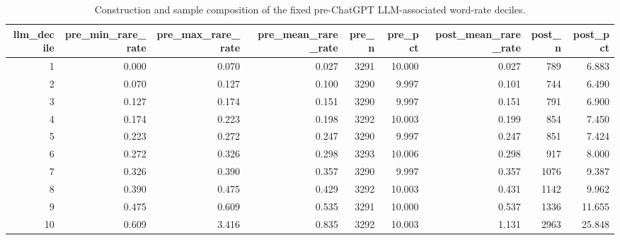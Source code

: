 \begin{table}
\caption{Construction and sample composition of the fixed pre-ChatGPT LLM-associated word-rate deciles.}
\label{tab:llm_decile_composition}
\begin{tabular}{rrrrrrrrr}
\toprule
llm_decile & pre_min_rare_rate & pre_max_rare_rate & pre_mean_rare_rate & pre_n & pre_pct & post_mean_rare_rate & post_n & post_pct \\
\midrule
1 & 0.000 & 0.070 & 0.027 & 3291 & 10.000 & 0.027 & 789 & 6.883 \\
2 & 0.070 & 0.127 & 0.100 & 3290 & 9.997 & 0.101 & 744 & 6.490 \\
3 & 0.127 & 0.174 & 0.151 & 3290 & 9.997 & 0.151 & 791 & 6.900 \\
4 & 0.174 & 0.223 & 0.198 & 3292 & 10.003 & 0.199 & 854 & 7.450 \\
5 & 0.223 & 0.272 & 0.247 & 3290 & 9.997 & 0.247 & 851 & 7.424 \\
6 & 0.272 & 0.326 & 0.298 & 3293 & 10.006 & 0.298 & 917 & 8.000 \\
7 & 0.326 & 0.390 & 0.357 & 3290 & 9.997 & 0.357 & 1076 & 9.387 \\
8 & 0.390 & 0.475 & 0.429 & 3292 & 10.003 & 0.431 & 1142 & 9.962 \\
9 & 0.475 & 0.609 & 0.535 & 3291 & 10.000 & 0.537 & 1336 & 11.655 \\
10 & 0.609 & 3.416 & 0.835 & 3292 & 10.003 & 1.131 & 2963 & 25.848 \\
\bottomrule
\end{tabular}
\end{table}
